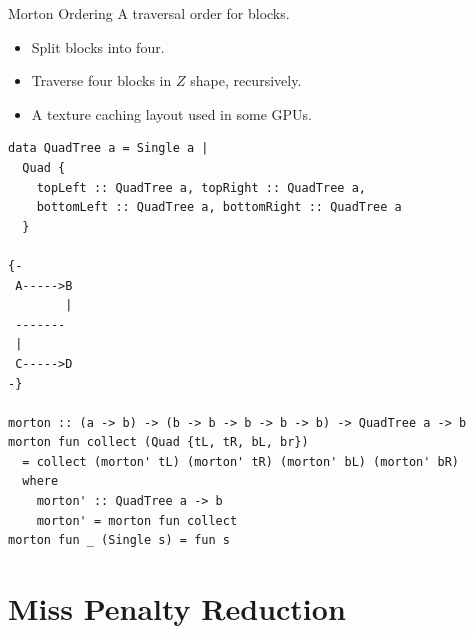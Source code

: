 \begin{definitionbox}{Morton Ordering}
    A traversal order for blocks.
    \begin{itemize}
        \item Split blocks into four.
        \item Traverse four blocks in $Z$ shape, recursively.
        \item A texture caching layout used in some GPUs.
    \end{itemize}
    \begin{verbatim}
data QuadTree a = Single a | 
  Quad { 
    topLeft :: QuadTree a, topRight :: QuadTree a, 
    bottomLeft :: QuadTree a, bottomRight :: QuadTree a
  }

{-
 A----->B
        |
 -------
 |
 C----->D
-}

morton :: (a -> b) -> (b -> b -> b -> b -> b) -> QuadTree a -> b
morton fun collect (Quad {tL, tR, bL, br}) 
  = collect (morton' tL) (morton' tR) (morton' bL) (morton' bR) 
  where
    morton' :: QuadTree a -> b
    morton' = morton fun collect
morton fun _ (Single s) = fun s
    \end{verbatim}
\end{definitionbox}

\section{Miss Penalty Reduction}

